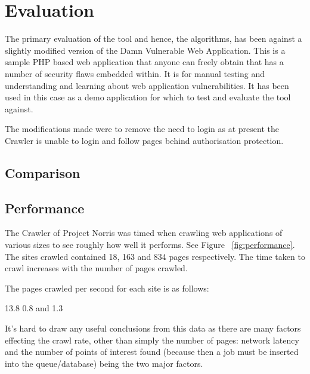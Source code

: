 \documentclass[12pt,a4paper]{article}
\begin{document}
\section{Evaluation}
The primary evaluation of the tool and hence, the algorithms, has been against a slightly modified version of the Damn Vulnerable Web Application.  This is a sample PHP based web application that anyone can freely obtain that has a number of security flaws embedded within.  It is for manual testing and understanding and learning about web application vulnerabilities.  It has been used in this case as a demo application for which to test and evaluate the tool against.

The modifications made were to remove the need to login as at present the Crawler is unable to login and follow pages behind authorisation protection.

\subsection{Comparison}

\subsection{Performance}
The Crawler of Project Norris was timed when crawling web applications of various sizes to see roughly how well it performs.  See Figure ~\ref{fig:performance}.
The sites crawled contained 18, 163 and 834 pages respectively.  The time taken to crawl increases with the number of pages crawled.

The pages crawled per second for each site is as follows:

13.8
0.8
and
1.3

It's hard to draw any useful conclusions from this data as there are many factors effecting the crawl rate, other than simply the number of pages: network latency and the number of points of interest found (because then a job must be inserted into the queue/database) being the two major factors.
\end{document}
